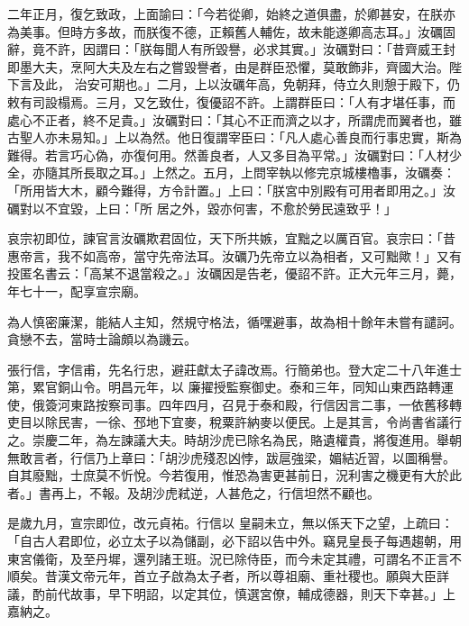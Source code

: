 \begin{pinyinscope}
 二年正月，復乞致政，上面諭曰：「今若從卿，始終之道俱盡，於卿甚安，在朕亦為美事。但時方多故，而朕復不德，正賴舊人輔佐，故未能遂卿高志耳。」汝礪固辭，竟不許，因謂曰：「朕每聞人有所毀譽，必求其實。」汝礪對曰：「昔齊威王封即墨大夫，烹阿大夫及左右之嘗毀譽者，由是群臣恐懼，莫敢飾非，齊國大治。陛下言及此，
 治安可期也。」二月，上以汝礪年高，免朝拜，侍立久則憩于殿下，仍敕有司設榻焉。三月，又乞致仕，復優詔不許。上謂群臣曰：「人有才堪任事，而處心不正者，終不足貴。」汝礪對曰：「其心不正而濟之以才，所謂虎而翼者也，雖古聖人亦未易知。」上以為然。他日復謂宰臣曰：「凡人處心善良而行事忠實，斯為難得。若言巧心偽，亦復何用。然善良者，人又多目為平常。」汝礪對曰：「人材少全，亦隨其所長取之耳。」上然之。五月，上問宰執以修完京城樓櫓事，汝礪奏：「所用皆大木，顧今難得，方令計置。」上曰：「朕宮中別殿有可用者即用之。」汝礪對以不宜毀，上曰：「所
 居之外，毀亦何害，不愈於勞民遠致乎！」



 哀宗初即位，諫官言汝礪欺君固位，天下所共嫉，宜黜之以厲百官。哀宗曰：「昔惠帝言，我不如高帝，當守先帝法耳。汝礪乃先帝立以為相者，又可黜歟！」又有投匿名書云：「高某不退當殺之。」汝礪因是告老，優詔不許。正大元年三月，薨，年七十一，配享宣宗廟。



 為人慎密廉潔，能結人主知，然規守格法，循嘿避事，故為相十餘年未嘗有譴訶。貪戀不去，當時士論頗以為譏云。



 張行信，字信甫，先名行忠，避莊獻太子諱改焉。行簡弟也。登大定二十八年進士第，累官銅山令。明昌元年，以
 廉擢授監察御史。泰和三年，同知山東西路轉運使，俄簽河東路按察司事。四年四月，召見于泰和殿，行信因言二事，一依舊移轉吏目以除民害，一徐、邳地下宜麥，稅粟許納麥以便民。上是其言，令尚書省議行之。崇慶二年，為左諫議大夫。時胡沙虎已除名為民，賂遺權貴，將復進用。舉朝無敢言者，行信乃上章曰：「胡沙虎殘忍凶悖，跋扈強梁，媚結近習，以圖稱譽。自其廢黜，士庶莫不忻悅。今若復用，惟恐為害更甚前日，況利害之機更有大於此者。」書再上，不報。及胡沙虎弒逆，人甚危之，行信坦然不顧也。



 是歲九月，宣宗即位，改元貞祐。行信以
 皇嗣未立，無以係天下之望，上疏曰：「自古人君即位，必立太子以為儲副，必下詔以告中外。竊見皇長子每遇趨朝，用東宮儀衛，及至丹墀，還列諸王班。況已除侍臣，而今未定其禮，可謂名不正言不順矣。昔漢文帝元年，首立子啟為太子者，所以尊祖廟、重社稷也。願與大臣詳議，酌前代故事，早下明詔，以定其位，慎選宮僚，輔成德器，則天下幸甚。」上嘉納之。




\end{pinyinscope}
